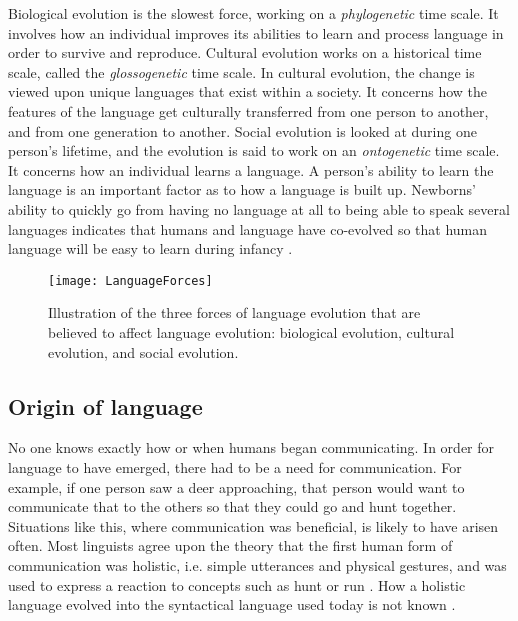 Biological evolution is the slowest force, working on a \textit{phylogenetic} time scale. It involves how an individual improves its abilities to learn and process language in order to survive and reproduce.
Cultural evolution works on a historical time scale, called the \textit{glossogenetic} time scale. In cultural evolution, the change is viewed upon unique languages that exist within a society. It concerns how the features of the language get culturally transferred from one person to another, and from one generation to another.
Social evolution is looked at during one person's lifetime, and the evolution is said to work on an \textit{ontogenetic} time scale. It concerns how an individual learns a language. A person's ability to learn the language is an important factor as to how a language is built up. Newborns' ability to quickly go from having no language at all to being able to speak several languages indicates that humans and language have co-evolved so that human language will be easy to learn during infancy \citep{tomasello2003makes}.

\begin{figure}[ht]
    \centering
    \texttt{[image: LanguageForces]}
    \caption[Illustration of the three forces of language evolution.]{Illustration of the three forces of language evolution that are believed to affect language evolution: biological evolution, cultural evolution, and social evolution.}
    \label{fig:LanguageForces}
\end{figure}

\subsection{Origin of language}
No one knows exactly how or when humans began communicating. In order for language to have emerged, there had to be a need for communication. For example, if one person saw a deer approaching, that person would want to communicate that to the others so that they could go and hunt together. Situations like this, where communication was beneficial, is likely to have arisen often. Most linguists agree upon the theory that the first human form of communication was holistic, i.e. simple utterances and physical gestures, and was used to express a reaction to concepts such as hunt or run \citep{christiansen2003language}. How a holistic language evolved into the syntactical language used today is not known \citep{bickerton2007language}.

